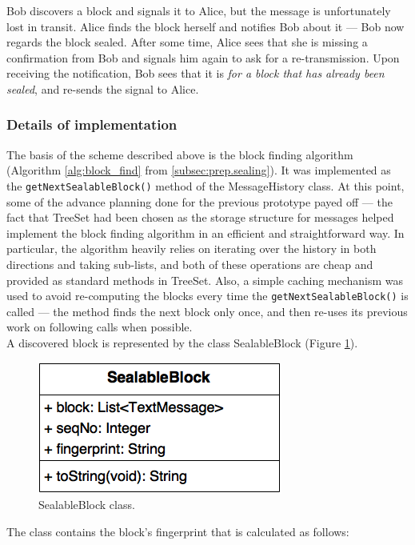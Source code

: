 \documentclass[a4paper, 12pt]{report}
\begin{document}
Bob discovers a block and signals it to Alice, but the message is unfortunately lost in transit. Alice finds the block herself and notifies Bob about it --- Bob now regards the block sealed. After some time, Alice sees that she is missing a confirmation from Bob and signals him again to ask for a re-transmission. Upon receiving the notification, Bob sees that it is \emph{for a block that has already been sealed}, and re-sends the signal to Alice. 


\subsubsection{Details of implementation}
The basis of the scheme described above is the block finding algorithm (Algorithm \ref{alg:block_find} from \cref{subsec:prep.sealing}). It was implemented as the \texttt{getNextSealableBlock()} method of the MessageHistory class. At this point, some of the advance planning done for the previous prototype payed off --- the fact that TreeSet had been chosen as the storage structure for messages helped implement the block finding algorithm in an efficient and straightforward way. In particular, the algorithm heavily relies on iterating over the history in both directions and taking sub-lists, and both of these operations are cheap and provided as standard methods in TreeSet. Also, a simple caching mechanism was used to avoid re-computing the blocks every time the \texttt{getNextSealableBlock()} is called --- the method finds the next block only once, and then re-uses its previous work on following calls when possible.\\

A discovered block is represented by the class SealableBlock (Figure \ref{fig:sealable_block_uml}).

\begin{figure}[H]
    \captionsetup{width=0.80\textwidth}
    \centering
    \includegraphics[width=0.4\linewidth]{pics/sealable_block_uml.png}
    \caption{\label{fig:sealable_block_uml} SealableBlock class.}
\end{figure}

The class contains the block's fingerprint that is calculated as follows:
\end{document}
